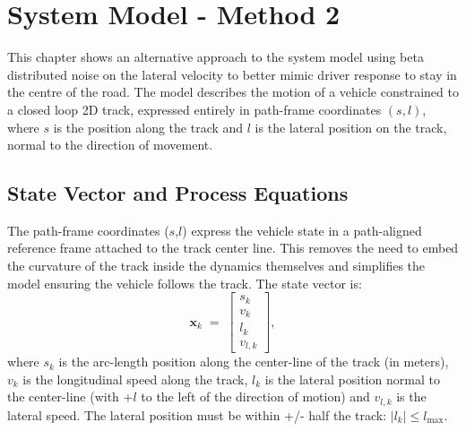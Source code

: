 \documentclass{article}
\begin{document}
\section{System Model - Method 2}
\label{sec:system_model}

This chapter shows an alternative approach to the system model using beta distributed noise on the lateral velocity to better mimic driver response to stay in the centre of the road. The model describes the motion of a vehicle constrained to a closed loop 2D track, expressed entirely in path-frame coordinates $(s,l)$, where $s$ is the position along the track and $l$ is the lateral position on the track, normal to the direction of movement. 

\subsection{State Vector and Process Equations}
\label{subsec:state_model}

The path-frame coordinates ($s$,$l$) express the vehicle state in a path-aligned reference frame attached to the track center line. This removes the need to embed the curvature of the track inside the dynamics themselves and simplifies the model ensuring the vehicle follows the track.  The state vector is:
\begin{equation}
    \mathbf{x}_k \;=\; \begin{bmatrix} s_k \\ v_k \\ l_k \\ v_{l,k} \end{bmatrix},
    \label{eq:state_vector}
\end{equation}
where $s_k$ is the arc-length position along the center-line of the track (in meters), $v_k$ is the longitudinal speed along the track, $l_k$ is the lateral position normal to the center-line (with $+l$ to the left of the direction of motion) and $v_{l,k}$ is the lateral speed. The lateral position must be within +/- half the track: $|l_k|\leq l_{\max}$.
\end{document}
